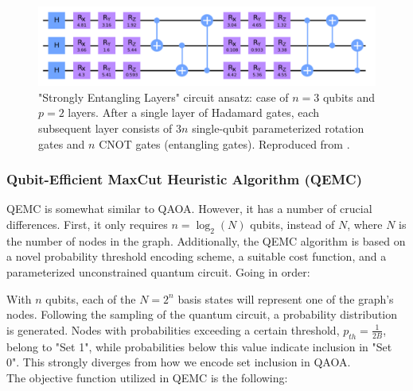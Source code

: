 \begin{figure}[b]
  \centering
  \includegraphics[width = \textwidth]{Figures/Strongly_Entangling_Layers.png}
  \caption{"Strongly Entangling Layers" circuit ansatz: case of $n = 3$ qubits and $p = 2$ layers. After a single layer of Hadamard gates, each subsequent layer consists of $3n$ single-qubit parameterized rotation gates and $n$ CNOT gates (entangling gates). Reproduced from \cite{tenecohen2023variational}.}
  \label{fig:Strongly_Entangling_Layers}
\end{figure}

\subsubsection{Qubit-Efficient MaxCut Heuristic Algorithm (QEMC)}
\label{sec: QEMC}

QEMC \cite{tenecohen2023variational} is somewhat similar to QAOA. However, it has a number of crucial differences. First, it only requires $n = \log_2(N)$ qubits, instead of $N$, where $N$ is the number of nodes in the graph. Additionally, the QEMC algorithm is based on a novel probability threshold encoding scheme, a suitable cost function, and a parameterized unconstrained quantum circuit. Going in order: \vspace{1.5mm}

 With $n$ qubits, each of the $N = 2^{n}$ basis states will represent one of the graph's nodes. Following the sampling of the quantum circuit, a probability distribution is generated. Nodes with probabilities exceeding a certain threshold, $p_{th} = \frac{1}{2B}$, belong to "Set 1", while probabilities below this value indicate inclusion in "Set 0". This strongly diverges from how we encode set inclusion in QAOA. \\

 The objective function utilized in QEMC is the following:

